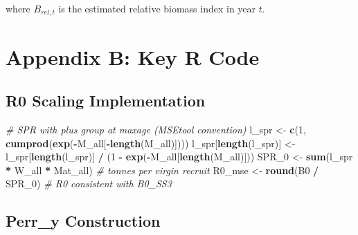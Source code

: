 \documentclass[
]{article}
\newenvironment{Shaded}{\begin{snugshade}}{\end{snugshade}}
\newcommand{\CommentTok}[1]{\textcolor[rgb]{0.56,0.35,0.01}{\textit{#1}}}
\newcommand{\DecValTok}[1]{\textcolor[rgb]{0.00,0.00,0.81}{#1}}
\newcommand{\FunctionTok}[1]{\textcolor[rgb]{0.13,0.29,0.53}{\textbf{#1}}}
\newcommand{\NormalTok}[1]{#1}
\newcommand{\OtherTok}[1]{\textcolor[rgb]{0.56,0.35,0.01}{#1}}
\newcommand{\SpecialCharTok}[1]{\textcolor[rgb]{0.81,0.36,0.00}{\textbf{#1}}}
\begin{document}
where \(B_{rel,t}\) is the estimated relative biomass index in year \(t\).

\pagebreak

\hypertarget{appendix-b-key-r-code}{%
\section{Appendix B: Key R Code}\label{appendix-b-key-r-code}}

\hypertarget{r0-scaling-implementation}{%
\subsection{R0 Scaling Implementation}\label{r0-scaling-implementation}}

\begin{Shaded}
\begin{Highlighting}[]
\CommentTok{\# SPR with plus group at maxage (MSEtool convention)}
\NormalTok{l\_spr }\OtherTok{\textless{}{-}} \FunctionTok{c}\NormalTok{(}\DecValTok{1}\NormalTok{, }\FunctionTok{cumprod}\NormalTok{(}\FunctionTok{exp}\NormalTok{(}\SpecialCharTok{{-}}\NormalTok{M\_all[}\SpecialCharTok{{-}}\FunctionTok{length}\NormalTok{(M\_all)])))}
\NormalTok{l\_spr[}\FunctionTok{length}\NormalTok{(l\_spr)] }\OtherTok{\textless{}{-}}\NormalTok{ l\_spr[}\FunctionTok{length}\NormalTok{(l\_spr)] }\SpecialCharTok{/}\NormalTok{ (}\DecValTok{1} \SpecialCharTok{{-}} \FunctionTok{exp}\NormalTok{(}\SpecialCharTok{{-}}\NormalTok{M\_all[}\FunctionTok{length}\NormalTok{(M\_all)]))}
\NormalTok{SPR\_0  }\OtherTok{\textless{}{-}} \FunctionTok{sum}\NormalTok{(l\_spr }\SpecialCharTok{*}\NormalTok{ W\_all }\SpecialCharTok{*}\NormalTok{ Mat\_all)  }\CommentTok{\# tonnes per virgin recruit}
\NormalTok{R0\_mse }\OtherTok{\textless{}{-}} \FunctionTok{round}\NormalTok{(B0 }\SpecialCharTok{/}\NormalTok{ SPR\_0)            }\CommentTok{\# R0 consistent with B0\_SS3}
\end{Highlighting}
\end{Shaded}

\hypertarget{perr_y-construction}{%
\subsection{Perr\_y Construction}\label{perr_y-construction}}
\end{document}
